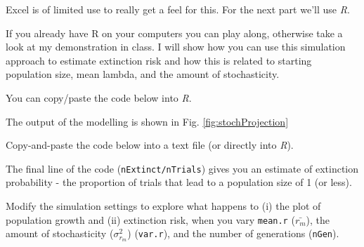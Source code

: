 \documentclass[
  a4paper]{book}
\begin{document}
Excel is of limited use to really get a feel for this. For the next part we'll use \emph{R}.

If you already have R on your computers you can play along, otherwise take a look at my demonstration in class. I will show how you can use this simulation approach to estimate extinction risk and how this is related to starting population size, mean lambda, and the amount of stochasticity.

You can copy/paste the code below into \emph{R}.

The output of the modelling is shown in Fig. \ref{fig:stochProjection}

\begin{do-something}
Copy-and-paste the code below into a text file (or directly into
\emph{R}).

The final line of the code (\texttt{nExtinct/nTrials}) gives you an
estimate of extinction probability - the proportion of trials that lead
to a population size of 1 (or less).

Modify the simulation settings to explore what happens to (i) the plot
of population growth and (ii) extinction risk, when you vary
\texttt{mean.r} (\(\bar{r_m}\)), the amount of stochasticity
(\(\sigma_{r_m}^2\)) (\texttt{var.r}), and the number of generations
(\texttt{nGen}).
\end{do-something}
\end{document}
